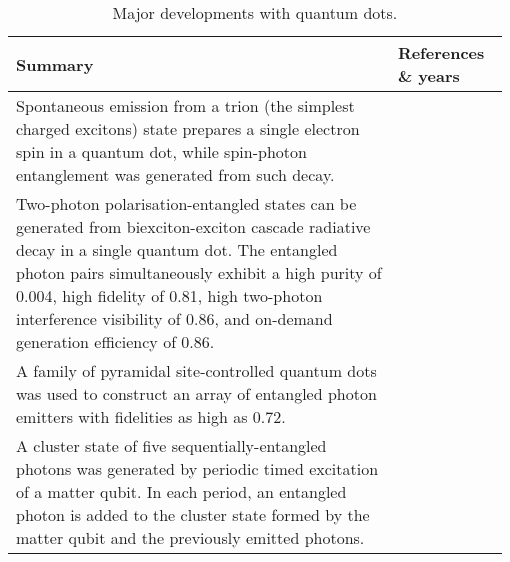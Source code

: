 \begin{table*}[!htbp]
	\begin{tabular}{|p{0.755\linewidth}|p{0.22\linewidth}|}
		\hline
	\textbf{Summary} & \textbf{References \& years} \\	\hline \hline
		Spontaneous emission from a trion (the simplest charged excitons) state prepares a single electron spin in a quantum dot, while spin-photon entanglement was generated from such decay. &  \cite{bib:de2012quantum, bib:gao2012observation} \\
		\hline
	    Two-photon polarisation-entangled states can be generated from biexciton-exciton cascade radiative decay in a single quantum dot. The entangled photon pairs simultaneously exhibit a high purity of 0.004, high fidelity of 0.81, high two-photon interference visibility of 0.86, and on-demand generation efficiency of 0.86. & \cite{bib:muller2014demand} \\
		\hline
		A family of pyramidal site-controlled quantum dots was used to construct an array of entangled photon emitters with fidelities as high as 0.72. & \cite{bib:juska2013towards, bib:mohan2010polarization} \\
		\hline
		A cluster state of five sequentially-entangled  photons was generated by periodic timed excitation of a matter qubit. In each period, an entangled photon is added to the cluster state formed by the matter qubit and the previously emitted photons. & \cite{bib:schwartz2016deterministic} \\
		\hline
	\end{tabular}
	\captionspacetab \caption{Major developments with quantum dots.} \label{tab:quantum_dots}
\end{table*}

